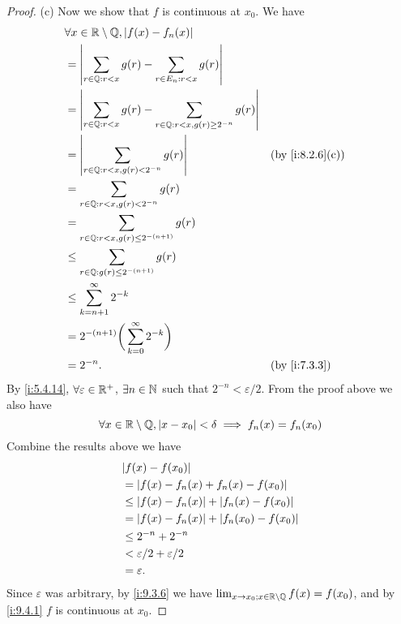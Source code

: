 \begin{proof}{(c)}
  Now we show that \(f\) is continuous at \(x_0\).
  We have
  \begin{align*}
     & \forall x \in \R \setminus \Q, \abs{f(x) - f_n(x)}                                                         \\
     & = \abs{\sum_{r \in \Q : r < x} g(r) - \sum_{r \in E_n : r < x} g(r)}                                       \\
     & = \abs{\sum_{r \in \Q : r < x} g(r) - \sum_{r \in \Q : r < x, g(r) \geq 2^{-n}} g(r)}                      \\
     & = \abs{\sum_{r \in \Q : r < x, g(r) < 2^{-n}} g(r)}                                   &  & \by{i:8.2.6}[c] \\
     & = \sum_{r \in \Q : r < x, g(r) < 2^{-n}} g(r)                                                              \\
     & = \sum_{r \in \Q : r < x, g(r) \leq 2^{-(n + 1)}} g(r)                                                     \\
     & \leq \sum_{r \in \Q : g(r) \leq 2^{-(n + 1)}} g(r)                                                         \\
     & \leq \sum_{k = n + 1}^\infty 2^{-k}                                                                        \\
     & = 2^{-(n + 1)} \bigg(\sum_{k = 0}^\infty 2^{-k}\bigg)                                                      \\
     & = 2^{-n}.                                                                             &  & \by{i:7.3.3}
  \end{align*}
  By \cref{i:5.4.14}, \(\forall \varepsilon \in \mathbb{R}^+\), \(\exists n \in \mathbb{N}\) such that \(2^{-n} < \varepsilon / 2\).
  From the proof above we also have
  \[
    \forall x \in \mathbb{R} \setminus \mathbb{Q}, \left\lvert x - x_0\right\rvert < \delta \implies f_n(x) = f_n(x_0) \\
  \]
  Combine the results above we have
  \begin{align*}
     & \abs{f(x) - f(x_0)}                              \\
     & = \abs{f(x) - f_n(x) + f_n(x) - f(x_0)}          \\
     & \leq \abs{f(x) - f_n(x)} + \abs{f_n(x) - f(x_0)} \\
     & = \abs{f(x) - f_n(x)} + \abs{f_n(x_0) - f(x_0)}  \\
     & \leq 2^{-n} + 2^{-n}                             \\
     & < \varepsilon / 2 + \varepsilon / 2              \\
     & = \varepsilon.
  \end{align*}
  Since \(\varepsilon\) was arbitrary, by \cref{i:9.3.6} we have \(\lim_{x \to x_0 ; x \in \mathbb{R} \setminus \mathbb{Q}} f(x) = f(x_0)\), and by \cref{i:9.4.1} \(f\) is continuous at \(x_0\).
\end{proof}
